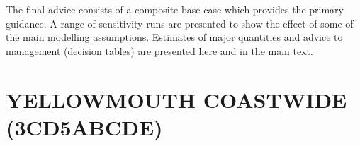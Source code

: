 \documentclass[11pt]{book}
\begin{document}
The final advice consists of a composite base case which provides the primary guidance.
A range of sensitivity runs are presented to show the effect of some of the main modelling assumptions.
Estimates of major quantities and advice to management (decision tables) are presented here and in the main text.




\renewcommand*{\arraystretch}{1.1}%

\newcommand{\nSims}{4,000}
\newcommand{\nChains}{8}
\newcommand{\cSims}{500}
\newcommand{\cBurn}{250}
\newcommand{\cSamps}{250}
\newcommand{\Nmcmc}{2,000}
\newcommand{\Nbase}{10,000}

\section{YELLOWMOUTH COASTWIDE (3CD5ABCDE)}



\renewcommand{\startYear}{1935} %
\renewcommand{\currYear}{2022}   %
\renewcommand{\prevYear}{2021}   %
\renewcommand{\projYear}{2032}   %
\renewcommand{\pgenYear}{2112}   %
\end{document}
